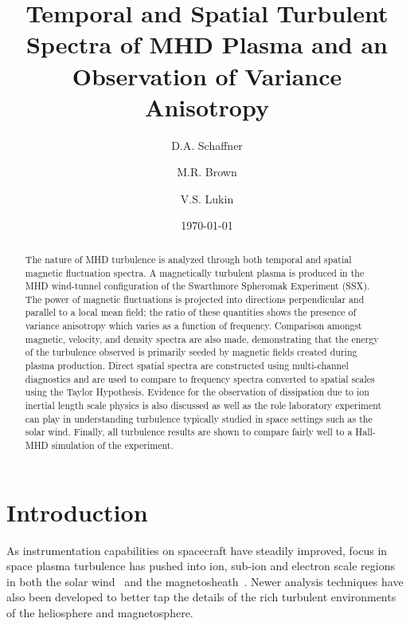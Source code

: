 \documentclass[aip,prl,amsmath,amssymb,reprint,superscriptaddress]{revtex4-1} %
\begin{document}
\title{Temporal and Spatial Turbulent Spectra of MHD Plasma and an Observation of Variance Anisotropy}

\author{D.A. Schaffner}
\author{M.R. Brown}
\author{V.S. Lukin}

\date{\today}
\begin{abstract}
The nature of MHD turbulence is analyzed through both temporal and spatial magnetic fluctuation spectra. A magnetically turbulent plasma is produced in the MHD wind-tunnel configuration of the Swarthmore Spheromak Experiment (SSX). The power of magnetic fluctuations is projected into directions perpendicular and parallel to a local mean field; the ratio of these quantities shows the presence of variance anisotropy which varies as a function of frequency. Comparison amongst magnetic, velocity, and density spectra are also made, demonstrating that the energy of the turbulence observed is primarily seeded by magnetic fields created during plasma production. Direct spatial spectra are constructed using multi-channel diagnostics and are used to compare to frequency spectra converted to spatial scales using the Taylor Hypothesis. Evidence for the observation of dissipation due to ion inertial length scale physics is also discussed as well as the role laboratory experiment can play in understanding turbulence typically studied in space settings such as the solar wind. Finally, all turbulence results are shown to compare fairly well to a Hall-MHD simulation of the experiment. 
\end{abstract}

\maketitle

\section{Introduction}

As instrumentation capabilities on spacecraft have steadily improved, focus in space plasma turbulence has pushed into ion, sub-ion and electron scale regions in both the solar wind~\cite{alexandrova09,sahraoui09} and the magnetosheath~\cite{sahraoui06,yordanova08}. Newer analysis techniques have also been developed to better tap the details of the rich turbulent environments of the heliosphere and magnetosphere. 
\end{document}
